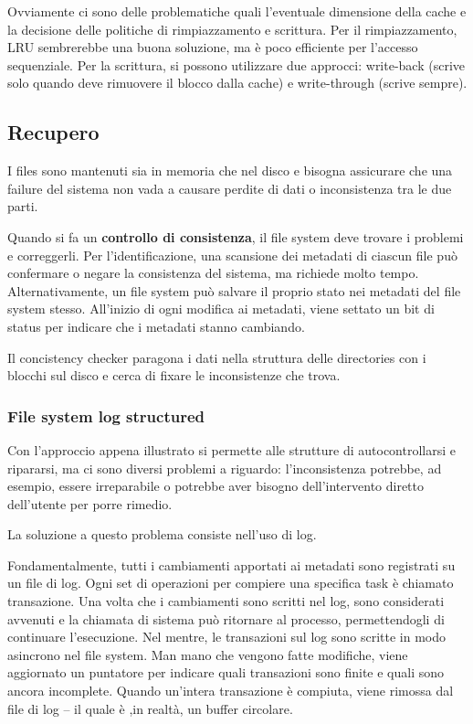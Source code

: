\documentclass[a4paper]{article}
\begin{document}
Ovviamente ci sono delle problematiche quali l'eventuale dimensione della cache e la decisione delle politiche di rimpiazzamento e scrittura. Per il rimpiazzamento, LRU sembrerebbe una buona soluzione, ma è poco efficiente per l'accesso sequenziale. Per la scrittura, si possono utilizzare due approcci: write-back (scrive solo quando deve rimuovere il blocco dalla cache) e write-through (scrive sempre).

\subsection{Recupero}
I files sono mantenuti sia in memoria che nel disco e bisogna assicurare che una failure del sistema non vada a causare perdite di dati o inconsistenza tra le due parti.

Quando si fa un \textbf{controllo di consistenza}, il file system deve trovare i problemi e correggerli. Per l'identificazione, una scansione dei metadati di ciascun file può confermare o negare la consistenza del sistema, ma richiede molto tempo. Alternativamente, un file system può salvare il proprio stato nei metadati del file system stesso. All'inizio di ogni modifica ai metadati, viene settato un bit di status per indicare che i metadati stanno cambiando.

Il concistency checker paragona i dati nella struttura delle directories con i blocchi sul disco e cerca di fixare le inconsistenze che trova.

\subsubsection{File system log structured}
Con l'approccio appena illustrato si permette alle strutture di autocontrollarsi e ripararsi, ma ci sono diversi problemi a riguardo: l'inconsistenza potrebbe, ad esempio, essere irreparabile o potrebbe aver bisogno dell'intervento diretto dell'utente per porre rimedio.

La soluzione a questo problema consiste nell'uso di log.

Fondamentalmente, tutti i cambiamenti apportati ai metadati sono registrati su un file di log. Ogni set di operazioni per compiere una specifica task è chiamato transazione. Una volta che i cambiamenti sono scritti nel log, sono considerati avvenuti e la chiamata di sistema può ritornare al processo, permettendogli di continuare l'esecuzione. Nel mentre, le transazioni sul log sono scritte in modo asincrono nel file system. Man mano che vengono fatte modifiche, viene aggiornato un puntatore per indicare quali transazioni sono finite e quali sono ancora incomplete. Quando un'intera transazione è compiuta, viene rimossa dal file di log -- il quale è ,in realtà, un buffer circolare.
\end{document}
